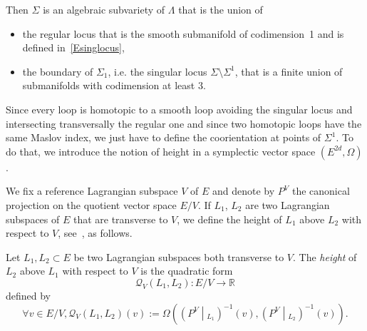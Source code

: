 \documentclass[AHL, Unicode, longabstracts, published]{cedram}
\newcommand*\cq{\mathcal{Q}}
\newcommand*\R{\mathbb{R}}
\let\oldforall\forall
\renewcommand*{\forall}{\mathrel{\oldforall}}
\begin{document}
Then $\Sigma$ is an algebraic subvariety of $\Lambda$ that is the union of
\begin{itemize}
\item the regular locus that is the smooth submanifold of codimension~1 and is defined in~\eqref{Esinglocus},
\item the boundary of $\Sigma_1$, i.e. the singular locus $\Sigma\setminus\Sigma^1$, that is a finite union of submanifolds with codimension at least 3.
\end{itemize}
Since every loop is homotopic to a smooth loop avoiding the singular locus and intersecting transversally the regular one and since two homotopic loops have the same Maslov index, we just have to define the coorientation at points of $\Sigma^1$. To do that, we introduce the notion of height in a symplectic vector space $(E^{2d}, \Omega)$.

We fix a reference Lagrangian subspace $V$ of $E$ and denote by $P^V$ the canonical projection on the quotient vector space $E/V$. If $L_1$, $L_2$ are two Lagrangian subspaces of $E$ that are transverse to $V$, we define the height of $L_1$ above $L_2$ with respect to $V$, see~\cite{Arn08}, as follows.

\begin{defi}
Let $L_1,L_2\subset E$ be two Lagrangian subspaces both transverse to $V$. The \emph{height} of $L_2$ above $L_1$ with respect to $V$ is the quadratic form
\[
\cq_V(L_1,L_2):E/V\to\R
\]
defined by
\[
\forall v\in E/V, \cq_V(L_1,L_2)(v):=\Omega\left(\left({P}^V\middle|_{L_1}\right)^{-1}(v),\left({P}^V\middle|_{L_2}\right)^{-1}(v)\right).
\]
\end{defi}
\end{document}
